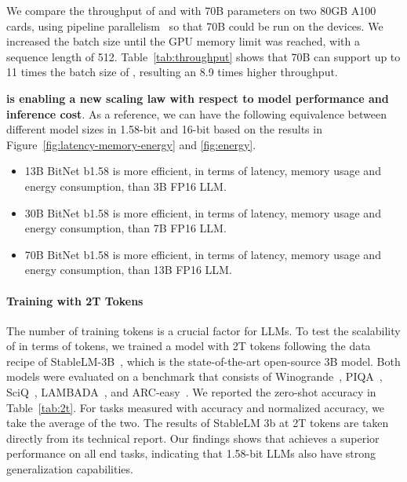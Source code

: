 We compare the throughput of \our{} and \llama{} with 70B parameters on two 80GB A100 cards, using pipeline parallelism~\cite{gpipe} so that \llama{} 70B could be run on the devices. We increased the batch size until the GPU memory limit was reached, with a sequence length of 512. Table~\ref{tab:throughput} shows that \our{} 70B can support up to 11 times the batch size of \llama{}, resulting an 8.9 times higher throughput.

\textbf{\our{} is enabling a new scaling law with respect to model performance and inference cost}. As a reference, we can have the following equivalence between different model sizes in 1.58-bit and 16-bit based on the results in Figure~\ref{fig:latency-memory-energy} and \ref{fig:energy}.
\begin{itemize}
    \item 13B BitNet b1.58 is more efficient, in terms of latency, memory usage and energy consumption, than 3B FP16 LLM.
    \item 30B BitNet b1.58 is more efficient, in terms of latency, memory usage and energy consumption, than 7B FP16 LLM.
    \item 70B BitNet b1.58 is more efficient, in terms of latency, memory usage and energy consumption, than 13B FP16 LLM.
\end{itemize}


\paragraph{Training with 2T Tokens}

The number of training tokens is a crucial factor for LLMs. To test the scalability of \our{} in terms of tokens, we trained a \our{} model with 2T tokens following the data recipe of StableLM-3B~\cite{StableLM-3B-4E1T}, which is the state-of-the-art open-source 3B model. Both models were evaluated on a benchmark that consists of Winogrande~\cite{winoGrande}, PIQA~\cite{piqa}, SciQ~\cite{sciq}, LAMBADA~\cite{lambada}, and ARC-easy~\cite{arc}. We reported the zero-shot accuracy in Table~\ref{tab:2t}. For tasks measured with accuracy and normalized accuracy, we take the average of the two. The results of StableLM 3b at 2T tokens are taken directly from its technical report. Our findings shows that \our{} achieves a superior performance on all end tasks, indicating that 1.58-bit LLMs also have strong generalization capabilities.



